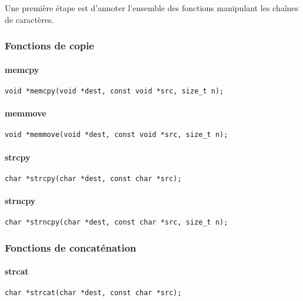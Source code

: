 Une première étape est d'annoter l'ensemble des fonctions manipulant les chaînes
de caractères.

\subsubsection{Fonctions de copie}

\paragraph{memcpy}

\begin{Verbatim}
void *memcpy(void *dest, const void *src, size_t n);
\end{Verbatim}

\paragraph{memmove}

\begin{Verbatim}
void *memmove(void *dest, const void *src, size_t n);
\end{Verbatim}

\paragraph{strcpy}

\begin{Verbatim}
char *strcpy(char *dest, const char *src);
\end{Verbatim}

\paragraph{strncpy}

\begin{Verbatim}
char *strncpy(char *dest, const char *src, size_t n);
\end{Verbatim}

\subsubsection{Fonctions de concaténation}

\paragraph{strcat}
\begin{Verbatim}
char *strcat(char *dest, const char *src);
\end{Verbatim}
